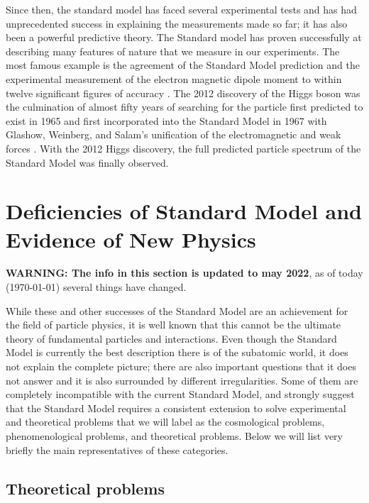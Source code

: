 Since then, the standard model has faced several experimental tests and has had unprecedented success in explaining the measurements made so far; it has also been a powerful predictive theory. The Standard model has proven  successfully at describing many features of nature that we measure in our experiments. The most famous example is the agreement of the Standard Model prediction and the experimental measurement of the electron magnetic dipole moment to within twelve  significant figures of accuracy \cite{PhysRevLett.97.030801}.  The 2012 discovery of the Higgs boson was the culmination of almost fifty years of searching for the particle first predicted to exist in 1965 and first incorporated into the Standard Model in 1967 with Glashow, Weinberg, and Salam's unification of the electromagnetic and weak forces \cite{PhysRevLett.19.1264, gl1961579}. With the 2012 Higgs discovery, the full predicted particle spectrum of the Standard Model was finally observed.


\section{Deficiencies of Standard Model and Evidence of New Physics}


{\Large \textbf{WARNING: The info in this section is updated to may 2022}, as of today (\today) several things have changed.}

While these and other successes of the Standard Model are an achievement for the field of particle physics, it is well known that this cannot be the ultimate theory of fundamental particles and interactions. Even though the Standard Model is currently the best description there is of the subatomic world, it does not explain the complete picture; there are also important questions that it does not answer and it is also surrounded by different irregularities. Some of them are completely incompatible with the current Standard Model, and strongly suggest that the Standard Model requires a consistent extension to solve experimental and theoretical problems that we will label as the cosmological problems, phenomenological problems, and theoretical problems. Below we will list very briefly the main representatives of these categories.



\subsection{Theoretical problems}

